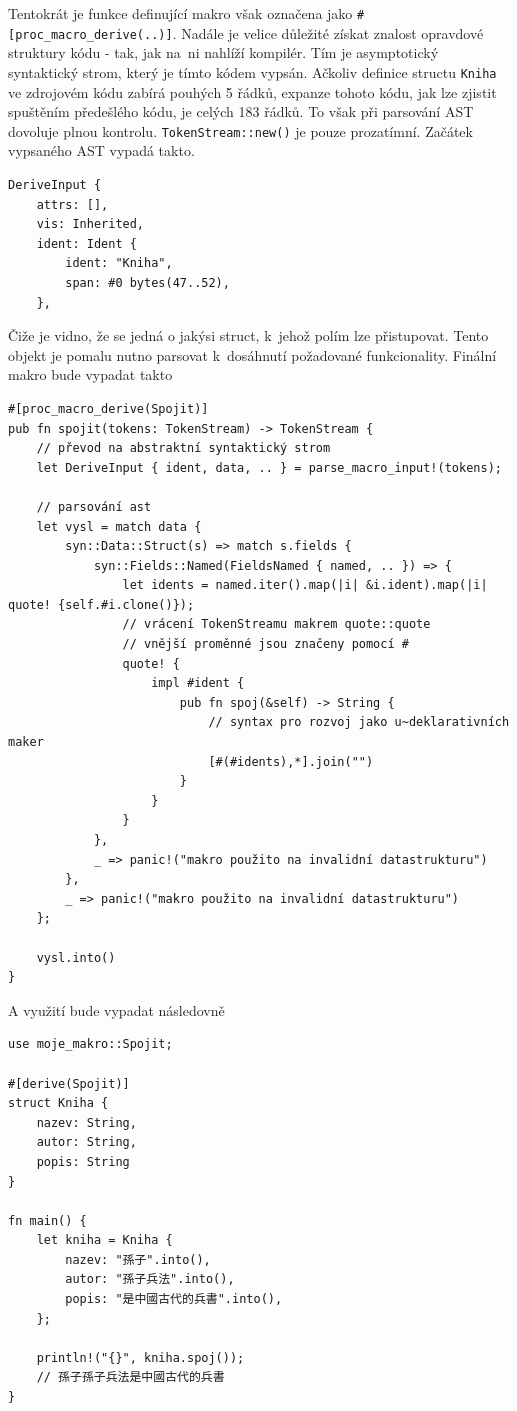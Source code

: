 \documentclass[a4paper, 12pt, twoside]{article} %
\newcommand{\rust}[1]{\texttt{#1}}
\begin{document}
			Tentokrát je funkce definující makro však označena jako \linebreak\texttt{\#[proc\_macro\_derive(..)]}. Nadále je velice důležité získat znalost opravdové struktury kódu - tak, jak na~ni nahlíží kompilér. Tím je asymptotický syntaktický strom, který je tímto kódem vypsán. Ačkoliv definice structu \rust{Kniha} ve zdrojovém kódu zabírá pouhých 5 řádků, expanze tohoto kódu, jak lze zjistit spuštěním předešlého kódu, je celých 183 řádků. To však při parsování AST dovoluje plnou kontrolu. \rust{TokenStream::new()} je pouze prozatímní. Začátek vypsaného AST vypadá takto.
			\begin{verbatim}
DeriveInput {
	attrs: [],
	vis: Inherited,
	ident: Ident {
		ident: "Kniha",
		span: #0 bytes(47..52),
	},
			\end{verbatim}
			
			Čiže je vidno, že se jedná o jakýsi struct, k~jehož polím lze přistupovat. Tento objekt je pomalu nutno parsovat k~dosáhnutí požadované funkcionality. Finální makro bude vypadat takto
			\begin{verbatim}
#[proc_macro_derive(Spojit)]
pub fn spojit(tokens: TokenStream) -> TokenStream {
	// převod na abstraktní syntaktický strom
	let DeriveInput { ident, data, .. } = parse_macro_input!(tokens);

	// parsování ast
	let vysl = match data {
		syn::Data::Struct(s) => match s.fields {
			syn::Fields::Named(FieldsNamed { named, .. }) => {
				let idents = named.iter().map(|i| &i.ident).map(|i| quote! {self.#i.clone()});
				// vrácení TokenStreamu makrem quote::quote
				// vnější proměnné jsou značeny pomocí #
				quote! {
					impl #ident {
						pub fn spoj(&self) -> String {
							// syntax pro rozvoj jako u~deklarativních maker
							[#(#idents),*].join("")
						}
					}
				}
			},
			_ => panic!("makro použito na invalidní datastrukturu")
		},
		_ => panic!("makro použito na invalidní datastrukturu")
	};

	vysl.into()
}
			\end{verbatim}
			
			A využití bude vypadat následovně
			\begin{verbatim}
use moje_makro::Spojit;

#[derive(Spojit)]
struct Kniha {
	nazev: String,
	autor: String,
	popis: String
}

fn main() {
	let kniha = Kniha {
		nazev: "孫子".into(),
		autor: "孫子兵法".into(),
		popis: "是中國古代的兵書".into(),
	};

	println!("{}", kniha.spoj());
	// 孫子孫子兵法是中國古代的兵書
}
			\end{verbatim}
			\cite{atrib_makro}
			
\end{document}
